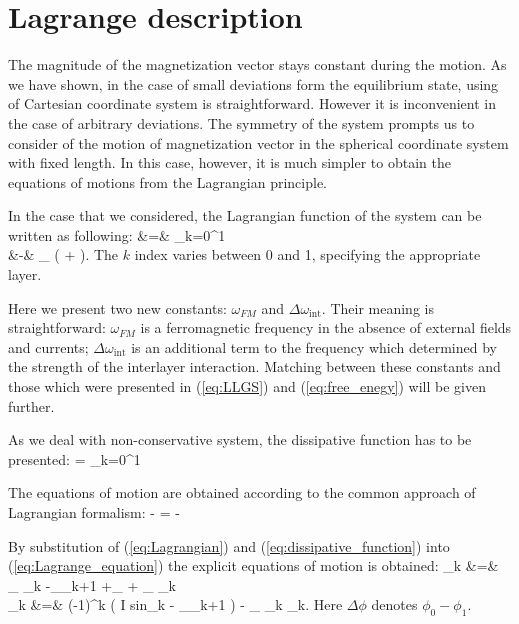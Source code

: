 \newpage

\section{Lagrange description}

The magnitude of the magnetization vector stays constant during the motion. As we have shown, in the case of small deviations form the equilibrium state, using of Cartesian coordinate system is straightforward. However it is inconvenient in the case of arbitrary deviations. The symmetry of the system prompts us to consider of the motion of magnetization vector in the spherical coordinate system with fixed length. In this case, however, it is much simpler to obtain the equations of motions from the Lagrangian principle.

In the case that we considered, the Lagrangian function of the system can be written as following:
\bea
\label{eq:Lagrangian}
 &=&	 \sum_{k=0}^1
	 \nn \\
	&-&  \Delta \omega_
	\left(
		 
		+  
	\right).
\eea
The $k$ index varies between 0 and 1, specifying the appropriate layer.

Here we present two new constants: $\omega_{FM}$ and $\Delta \omega_\text{int}$. Their meaning is straightforward: $\omega_{FM}$ is a ferromagnetic frequency in the absence of external fields and currents; $\Delta \omega_\text{int}$ is an additional term to the frequency which determined by the strength of the interlayer interaction. Matching between these constants and those which were presented in (\ref{eq:LLGS}) and (\ref{eq:free_enegy}) will be given further.

As we deal with non-conservative system, the dissipative function has to be presented:
\bea
\label{eq:dissipative_function}
 =  \sum_{k=0}^1
\eea

The equations of motion are obtained according to the common approach of Lagrangian formalism:
\be
\label{eq:Lagrange_equation}
	 -  =
	-
\ee

By substitution of (\ref{eq:Lagrangian}) and (\ref{eq:dissipative_function}) into (\ref{eq:Lagrange_equation}) the explicit equations of motion is obtained:
\bea
\label{eq:equation_of_motion}
\dot{\phi}_k &=&
	\omega_ \cos \theta_k
	-\Delta\omega_\cos \theta_{k+1}
	+\Delta\omega_
		\cos\Delta\phi
	+ \alpha_ \dot{\theta}_k \nn \\
\dot{\theta}_k &=&
	(-1)^k
	\left(
		\epsilon\sigma I sin\theta_k
		- \Delta\omega_\sin\theta_{k+1}\sin\Delta\phi
	\right)
	- \alpha_ \dot{\phi}_k \sin\theta_k.
\eea
Here $\Delta\phi$ denotes $\phi_0 - \phi_1$.



